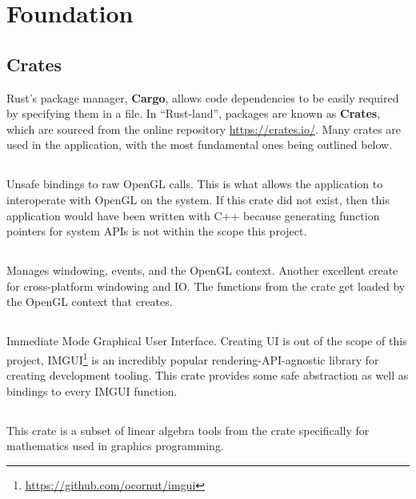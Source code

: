 \section{Foundation}\label{sec:foundation}

\subsection{Crates}
Rust's package manager, \textbf{Cargo}, allows code dependencies to be easily required by specifying them in a  file.
In “Rust-land”, packages are known as \textbf{Crates}, which are sourced from the online repository \url{https://crates.io/}.
Many crates are used in the application, with the most fundamental ones being outlined below.

\subsection{}
Unsafe bindings to raw OpenGL calls.
This is what allows the application to interoperate with OpenGL on the system.
If this crate did not exist, then this application would have been written with C++ because generating function pointers for system APIs is not within the scope this project.

\subsection{}
Manages windowing, events, and the OpenGL context.
Another excellent create for cross-platform windowing and IO\@.
The functions from the  crate get loaded by the OpenGL context that  creates.

\subsection{}
Immediate Mode Graphical User Interface.
Creating UI is out of the scope of this project, IMGUI\footnote{\url{https://github.com/ocornut/imgui}} is an incredibly popular rendering-API-agnostic library for creating development tooling.
This crate provides some safe abstraction as well as bindings to every IMGUI function.

\subsection{}
This crate is a subset of linear algebra tools from the  crate specifically for mathematics used in graphics programming.

